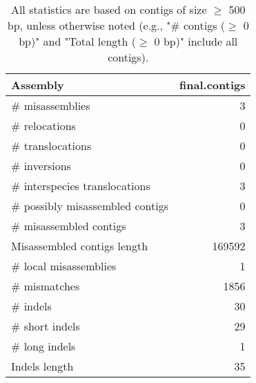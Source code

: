 \documentclass[12pt,a4paper]{article}
\begin{document}
\begin{table}[ht]
\begin{center}
\caption{All statistics are based on contigs of size $\geq$ 500 bp, unless otherwise noted (e.g., "\# contigs ($\geq$ 0 bp)" and "Total length ($\geq$ 0 bp)" include all contigs).}
\begin{tabular}{|l*{1}{|r}|}
\hline
Assembly & final.contigs \\ \hline
\# misassemblies & 3 \\ \hline
\hspace{5mm}\# relocations & 0 \\ \hline
\hspace{5mm}\# translocations & 0 \\ \hline
\hspace{5mm}\# inversions & 0 \\ \hline
\hspace{5mm}\# interspecies translocations & 3 \\ \hline
\# possibly misassembled contigs & 0 \\ \hline
\# misassembled contigs & 3 \\ \hline
Misassembled contigs length & 169592 \\ \hline
\# local misassemblies & 1 \\ \hline
\# mismatches & 1856 \\ \hline
\# indels & 30 \\ \hline
\hspace{5mm}\# short indels & 29 \\ \hline
\hspace{5mm}\# long indels & 1 \\ \hline
Indels length & 35 \\ \hline
\end{tabular}
\end{center}
\end{table}
\end{document}
